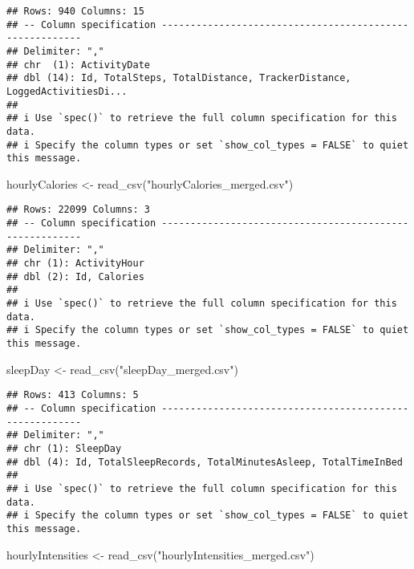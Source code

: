 \documentclass[
]{article}
\newenvironment{Shaded}{\begin{snugshade}}{\end{snugshade}}
\newcommand{\FunctionTok}[1]{\textcolor[rgb]{0.00,0.00,0.00}{#1}}
\newcommand{\NormalTok}[1]{#1}
\newcommand{\OtherTok}[1]{\textcolor[rgb]{0.56,0.35,0.01}{#1}}
\newcommand{\StringTok}[1]{\textcolor[rgb]{0.31,0.60,0.02}{#1}}
\begin{document}
\begin{verbatim}
## Rows: 940 Columns: 15
## -- Column specification --------------------------------------------------------
## Delimiter: ","
## chr  (1): ActivityDate
## dbl (14): Id, TotalSteps, TotalDistance, TrackerDistance, LoggedActivitiesDi...
## 
## i Use `spec()` to retrieve the full column specification for this data.
## i Specify the column types or set `show_col_types = FALSE` to quiet this message.
\end{verbatim}

\begin{Shaded}
\begin{Highlighting}[]
\NormalTok{hourlyCalories }\OtherTok{\textless{}{-}} \FunctionTok{read\_csv}\NormalTok{(}\StringTok{"hourlyCalories\_merged.csv"}\NormalTok{)}
\end{Highlighting}
\end{Shaded}

\begin{verbatim}
## Rows: 22099 Columns: 3
## -- Column specification --------------------------------------------------------
## Delimiter: ","
## chr (1): ActivityHour
## dbl (2): Id, Calories
## 
## i Use `spec()` to retrieve the full column specification for this data.
## i Specify the column types or set `show_col_types = FALSE` to quiet this message.
\end{verbatim}

\begin{Shaded}
\begin{Highlighting}[]
\NormalTok{sleepDay }\OtherTok{\textless{}{-}} \FunctionTok{read\_csv}\NormalTok{(}\StringTok{"sleepDay\_merged.csv"}\NormalTok{)}
\end{Highlighting}
\end{Shaded}

\begin{verbatim}
## Rows: 413 Columns: 5
## -- Column specification --------------------------------------------------------
## Delimiter: ","
## chr (1): SleepDay
## dbl (4): Id, TotalSleepRecords, TotalMinutesAsleep, TotalTimeInBed
## 
## i Use `spec()` to retrieve the full column specification for this data.
## i Specify the column types or set `show_col_types = FALSE` to quiet this message.
\end{verbatim}

\begin{Shaded}
\begin{Highlighting}[]
\NormalTok{hourlyIntensities }\OtherTok{\textless{}{-}} \FunctionTok{read\_csv}\NormalTok{(}\StringTok{"hourlyIntensities\_merged.csv"}\NormalTok{)}
\end{Highlighting}
\end{Shaded}
\end{document}
